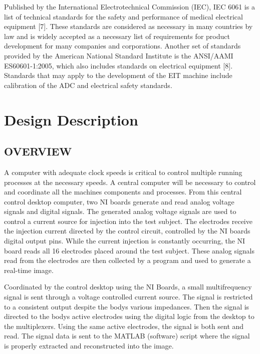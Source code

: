 Published by the International Electrotechnical Commission (IEC), IEC
6061 is a list of technical standards for the safety and performance of
medical electrical equipment {[}7{]}. These standards are considered as
necessary in many countries by law and is widely accepted as a necessary
list of requirements for product development for many companies and
corporations. Another set of standards provided by the American National
Standard Institute is the ANSI/AAMI ES60601-1:2005, which also includes
standards on electrical equipment {[}8{]}. Standards that may apply to
the development of the EIT machine include calibration of the ADC and
electrical safety standards.

\section{Design Description}\label{design-description}

\subsection{OVERVIEW}\label{overview}

A computer with adequate clock speeds is critical to control multiple
running processes at the necessary speeds. A central computer will be
necessary to control and coordinate all the machine\textquotesingle s
components and processes. From this central control desktop computer,
two NI boards generate and read analog voltage signals and digital
signals. The generated analog voltage signals are used to control a
current source for injection into the test subject. The electrodes
receive the injection current directed by the control circuit,
controlled by the NI boards\textquotesingle{} digital output pins. While
the current injection is constantly occurring, the NI board reads all 16
electrodes placed around the test subject. These analog signals read
from the electrodes are then collected by a program and used to generate
a real-time image.

Coordinated by the control desktop using the NI Boards, a small
multifrequency signal is sent through a voltage controlled current
source. The signal is restricted to a consistent output despite the
body\textquotesingle s various impedances. Then the signal is directed
to the body\textquotesingle s active electrodes using the digital logic
from the desktop to the multiplexers. Using the same active electrodes,
the signal is both sent and read. The signal data is sent to the MATLAB
(software) script where the signal is properly extracted and
reconstructed into the image.

